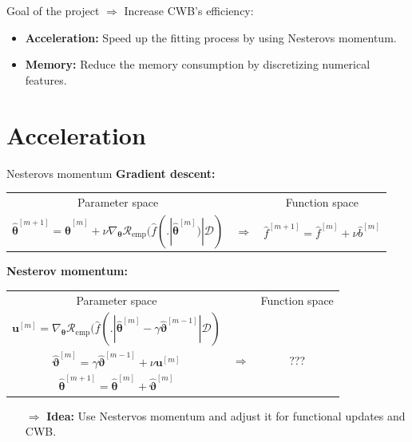 \documentclass[ignorenonframetext,]{beamer}
\providecommand{\tightlist}{%
  \setlength{\itemsep}{0pt}\setlength{\parskip}{0pt}}
\newcommand{\D}{\mathcal{D}}
\newcommand{\fh}{\hat{f}}
\newcommand{\fmh}{\fh^{[m]}}
\newcommand{\tb}{\bm{\theta}}
\newcommand{\tbh}{\hat{\bm{\theta}}}
\newcommand{\riske}{\mathcal{R}_{\text{emp}}}
\begin{document}
\begin{frame}{Goal of the project}
\protect\hypertarget{goal-of-the-project}{}
\(\Rightarrow\) Increase CWB's efficiency:

\begin{itemize}
\tightlist
\item
  \textbf{Acceleration:} Speed up the fitting process by using Nesterovs
  momentum.
\item
  \textbf{Memory:} Reduce the memory consumption by discretizing
  numerical features.
\end{itemize}
\end{frame}

\hypertarget{acceleration}{%
\section{Acceleration}\label{acceleration}}

\begin{frame}{Nesterovs momentum}
\protect\hypertarget{nesterovs-momentum}{}
\textbf{Gradient descent:}

\vspace{0.2cm}
{\small
\begin{tabular}{ccc}
  Parameter space & & Function space \\[0.3cm]
  $\tbh^{[m+1]} = \tbh^{[m]} + \nu \nabla_{\tb}\riske(\fh(. | \tbh^{[m]}) | \D)$ & $\Rightarrow$ & $\fh^{[m+1]} = \fmh + \nu \hat{b}^{[m]}$
\end{tabular}}
\vspace{0.2cm}

\textbf{Nesterov momentum:}

\vspace{0.2cm}
{\small
\begin{tabular}{ccc}
  Parameter space & & Function space \\[0.3cm]
  $\bm{u}^{[m]} = \nabla_{\tb}\riske(\fh(. | \tbh^{[m]} - \gamma \hat{\bm{\vartheta}}^{[m-1]} | \D)$ &  & \\
  $\hat{\bm{\vartheta}}^{[m]} = \gamma \hat{\bm{\vartheta}}^{[m-1]} + \nu \bm{u}^{[m]}$ & $\Rightarrow$ & ??? \\
  $\tbh^{[m+1]} = \tbh^{[m]} + \hat{\bm{\vartheta}}^{[m]}$ & &
\end{tabular}}
\vspace{0.2cm}

\begin{itemize}
\item[$\Rightarrow$] \textbf{Idea:} Use Nestervos momentum and adjust it for functional updates and CWB.
\end{itemize}
\end{frame}
\end{document}
